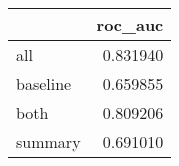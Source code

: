 \begin{tabular}{lr}
\toprule
{} &   roc\_auc \\
\midrule
all      &  0.831940 \\
baseline &  0.659855 \\
both     &  0.809206 \\
summary  &  0.691010 \\
\bottomrule
\end{tabular}
